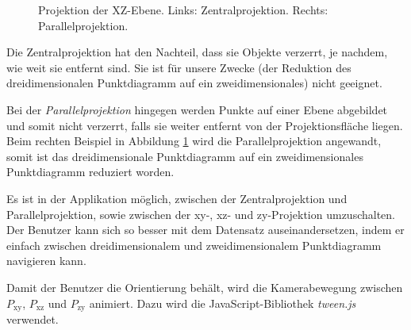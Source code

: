 \begin{figure}[!htbp]
\begin{minipage}{.45\textwidth}
	\end{minipage}
	\caption[Projektion der xz-Ebene]{Projektion der XZ-Ebene. Links: Zentralprojektion. Rechts: Parallelprojektion.}
	\label{fig:projections}
\end{figure}

Die Zentralprojektion hat den Nachteil, dass sie Objekte verzerrt, je nachdem, wie weit sie entfernt sind. Sie ist für unsere Zwecke (der Reduktion des dreidimensionalen Punktdiagramm auf ein zweidimensionales) nicht geeignet.

Bei der \textit{Parallelprojektion} hingegen werden Punkte auf einer Ebene abgebildet und somit nicht verzerrt, falls sie weiter entfernt von der Projektionsfläche liegen. Beim rechten Beispiel in Abbildung \ref{fig:projections} wird die Parallelprojektion angewandt, somit ist das dreidimensionale Punktdiagramm auf ein zweidimensionales Punktdiagramm reduziert worden.

Es ist in der Applikation möglich, zwischen der Zentralprojektion und Parallelprojektion, sowie zwischen der xy-, xz- und zy-Projektion umzuschalten. Der Benutzer kann sich so besser mit dem Datensatz auseinandersetzen, indem er einfach zwischen dreidimensionalem und zweidimensionalem Punktdiagramm navigieren kann.

Damit der Benutzer die Orientierung behält, wird die Kamerabewegung zwischen $P_{\text{xy}}$, $P_{\text{xz}}$ und $P_{\text{zy}}$ animiert. Dazu wird die JavaScript-Bibliothek \textit{tween.js} \cite{tween} verwendet.
